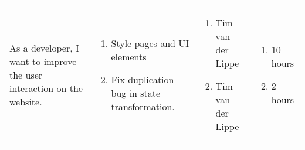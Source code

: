 \documentclass[11pt,a4paper]{article}
\begin{document}
\begin{table}[h]
\begin{tabular}{|p{4.5cm}|p{7cm}|p{4cm}|p{2.6cm}|}
As a developer, I want to improve the user interaction on the website.
&
\begin{enumerate}
\item Style pages and UI elements
\item Fix duplication bug in state transformation.
\end{enumerate}

& 
\begin{enumerate}
\item Tim van der Lippe
\item Tim van der Lippe
\end{enumerate}

& 
\begin{enumerate}
\item 10 hours
\item 2 hours
\end{enumerate}
\\
          
\end{tabular}
\end{table}
\end{document}
